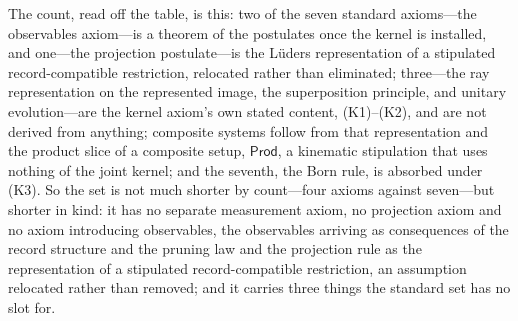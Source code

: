 The count, read off the table, is this: two of the seven standard axioms---the observables axiom---is a theorem of the postulates once the kernel is installed, and one---the projection postulate---is the L\"{u}ders representation of a stipulated record-compatible restriction, relocated rather than eliminated; three---the ray representation on the represented image, the superposition principle, and unitary evolution---are the kernel axiom's own stated content, (K1)--(K2), and are not derived from anything; composite systems follow from that representation and the product slice of a composite setup, $\mathsf{Prod}$, a kinematic stipulation that uses nothing of the joint kernel; and the seventh, the Born rule, is absorbed under (K3). So the set is not much shorter by count---four axioms against seven---but shorter in kind: it has no separate measurement axiom, no projection axiom and no axiom introducing observables, the observables arriving as consequences of the record structure and the pruning law and the projection rule as the representation of a stipulated record-compatible restriction, an assumption relocated rather than removed; and it carries three things the standard set has no slot for.

